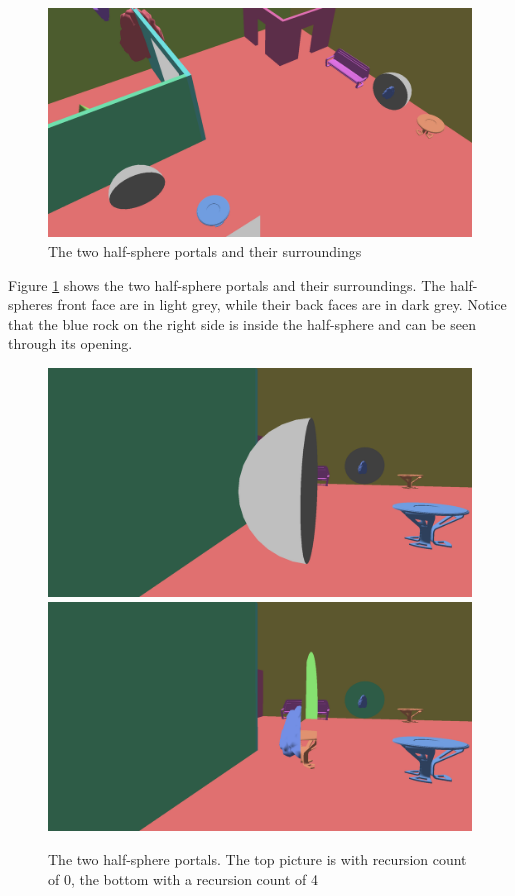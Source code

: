 \begin{figure}[H]
	\includegraphics[width=\linewidth]{images/nonplanarlayout.png}
	\caption{The two half-sphere portals and their surroundings}
	\label{fig:nonplanarlayout}
\end{figure}

Figure \ref{fig:nonplanarlayout} shows the two half-sphere portals and their surroundings. The half-spheres front face are in light grey, while their back faces are in dark grey. Notice that the blue rock on the right side is inside the half-sphere and can be seen through its opening.

\begin{figure}[H]
	\includegraphics[width=\linewidth]{images/NonPlanarR0.png}
	\includegraphics[width=\linewidth]{images/nonplanar.png}
	\caption{The two half-sphere portals. The top picture is with recursion count of 0, the bottom with a recursion count of 4}
	\label{fig:nonplanar}
\end{figure}

